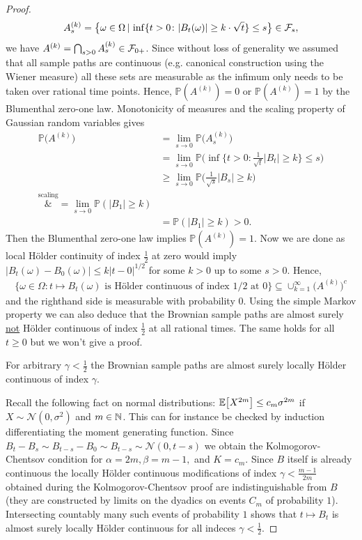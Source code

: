 \begin{proof}[Proof]
	$$A^{(k)}_s = \big\{\omega\in \Omega\,|\, \inf\{t>0\colon |B_t(\omega)| \geq k\cdot\sqrt{t}\}\leq s\big\}\in \mathcal{F}_s,$$ we have $A^{(k)} = \bigcap_{s>0} A^{(k)}_s \in \mathcal{F}_{0+}$. Since without loss of generality we assumed that all sample paths are continuous (e.g. canonical construction using the Wiener measure)	all these sets are measurable as the infimum only needs to be taken over rational time points. Hence, $\mathbb{P}(A^{(k)}) = 0$ or $\mathbb{P}(A^{(k)})=1$ by the Blumenthal zero-one law. Monotonicity of measures and the scaling property of Gaussian random variables gives
	\begin{align*}
		\mathbb{P}\big(A^{(k)}\big) &=\lim_{s\to 0} \mathbb{P}\big(A^{(k)}_s\big) \\
					&= \lim_{s\to 0} \mathbb{P}\Big(\inf\Big\{t>0\colon \frac{1}{\sqrt{t}}|B_t| \geq k\Big\}\leq s\Big) \\
					&\geq \lim_{s\to 0} \mathbb{P}\Big( \frac{1}{\sqrt{s}}|B_s| \geq k\Big) \\
					\overset{\text{scaling}}&{=} \lim_{s\to 0} \mathbb{P}\left( |B_1| \geq k\right) \\
					&=\mathbb{P}\left(|B_1| \geq k\right) > 0.
	\end{align*}
	Then the Blumenthal zero-one law implies $\mathbb{P}(A^{(k)})=1$. Now we are done as local H\"older continuity of index $\frac{1}{2}$ at zero would imply $|B_t(\omega)-B_0(\omega)|\leq k|t-0|^{1/2}$ for some $k>0$ up to some $s>0$. Hence, 
	\begin{align*}
		\{\omega\in \Omega: t\mapsto B_t(\omega)\text{ is H\"older continuous of index $1/2$ at }0\}\subseteq \cup_{k=1}^\infty \big(A^{(k)}\big)^c
	\end{align*} 
	and the righthand side is measurable with probability $0$. Using the simple Markov property we can also deduce that the Brownian sample paths are almost surely \underline{not} H\"older continuous of index $\frac{1}{2}$ at all rational times. The same holds for all $t\geq 0$ but we won't give a proof. 
	\begin{lstep}
		For arbitrary $\gamma<\frac{1}{2}$ the Brownian sample paths are almost surely locally H\"older continuous of index $\gamma$.
	\end{lstep}
	Recall the following fact on normal distributions: $\mathbb{E}\big[X^{2m}\big] \leq c_m \sigma^{2m}$ if $X\sim \mathcal N(0,\sigma^2)$ and $m\in\mathbb{N}$. This can for instance be checked by induction differentiating the moment generating function. Since $B_{t}-B_s\sim B_{t-s}-B_0\sim B_{t-s}\sim \mathcal N(0,t-s)$ we obtain the Kolmogorov-Chentsov condition for  $\alpha=2m,\beta=m-1,$ and $K=c_m$. Since $B$ itself is already continuous the locally H\"older continuous modifications of index $\gamma<\frac{m-1}{2m}$ obtained during the Kolmogorov-Chentsov proof are indistinguishable from $B$ (they are constructed by limits on the dyadics on events $C_m$ of probability $1$). Intersecting countably many such events of probability $1$ shows that $t\mapsto B_t$ is almost surely locally H\"older continuous for all indeces $\gamma<\frac{1}{2}$.
\end{proof}
